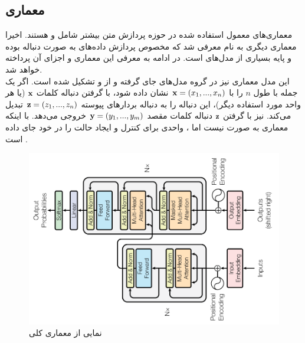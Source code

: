\subsection{معماری \transformer{}}
معماری‌های معمول استفاده شده در حوزه پردازش متن بیشتر شامل  و  هستند. اخیرا معماری دیگری به نام \transformer{} معرفی شد که مخصوص پردازش داده‌های به صورت دنباله بوده و پایه بسیاری از مدل‌های \stateoftheart{} است. در ادامه به معرفی این معماری و اجزای آن پرداخته خواهد شد.
\\
این مدل معماری نیز در گروه مدل‌های
جای گرفته و از \encoder{} و \decoder{} تشکیل شده است. اگر یک جمله با طول $n$ را با ${\bf x} = (x_1, ..., x_n)$  نشان داده شود، \encoder{} با گرفتن دنباله کلمات ${\bf x}$ (یا هر واحد مورد استفاده دیگر)، این دنباله  را به دنباله بردار‌های پیوسته ${\bf z} = (z_1, ..., z_n)$ تبدیل می‌کند. \decoder{} نیز با گرفتن ${\bf z}$ دنباله کلمات مقصد ${\bf y} = (y_1, ..., y_m)$ خروجی می‌دهد. با اینکه معماری \encoder{} به صورت \autoregressive{} نیست اما \decoder{}، واحدی برای کنترل و ایجاد حالت \autoregressive{} را در خود جای داده است \cite{transformer}.
\begin{figure}[H]
	\centering
	\includegraphics[width=.7\textwidth, angle=-90]{images/attention3.png}
	\caption{
        نمایی از معماری کلی \transformer{} \cite{transformer}}
\end{figure}

